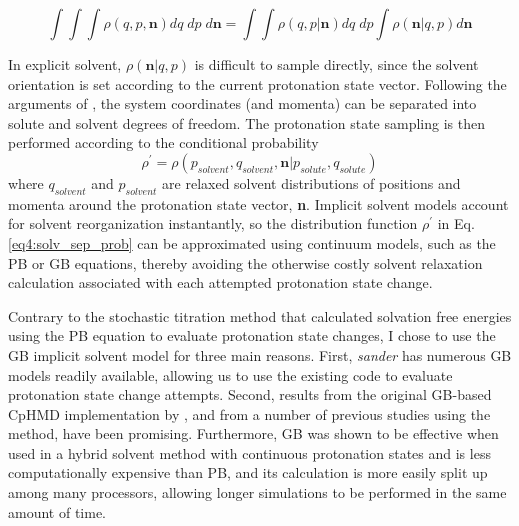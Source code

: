 \begin{equation}
   \int\int\int \rho(q, p, \textbf{n}) dq\;dp\;d\textbf{n} = 
      \int\int\rho(q, p | \textbf{n}) dq\;dp \int \rho(\textbf{n} | q, p)
      d\textbf{n}
   \label{eq4:conditional_probability}
\end{equation}

In explicit solvent, $\rho(\textbf{n} | q, p)$ is difficult to sample directly,
since the solvent orientation is set according to the current protonation state
vector. Following the arguments of
\citeauthor{Baptista_JChemPhys_2002_v117_p4184}, the system coordinates (and
momenta) can be separated into solute and solvent degrees of freedom. 
\cite{Baptista_JChemPhys_2002_v117_p4184} The protonation state sampling is then
performed according to the conditional probability
\begin{equation}
   \rho^\prime = \rho(p_{solvent}, q_{solvent}, \textbf{n} | p_{solute},
         q_{solute})
   \label{eq4:solv_sep_prob}
\end{equation}
where $q_{solvent}$ and $p_{solvent}$ are relaxed solvent
distributions of positions and momenta around the protonation state vector,
\textbf{n}. \cite{Baptista_JChemPhys_2002_v117_p4184} Implicit solvent models
account for solvent reorganization instantantly, so the distribution function
$\rho^\prime$ in Eq.  \ref{eq4:solv_sep_prob} can be approximated using
continuum models, such as the PB or GB equations, thereby avoiding the otherwise
costly solvent relaxation calculation associated with each attempted protonation
state change.

Contrary to the stochastic titration method that calculated solvation free
energies using the PB equation to evaluate protonation state changes,
\cite{Baptista_JChemPhys_2002_v117_p4184} I chose to use the GB implicit
solvent model for three main reasons. First, \emph{sander} has numerous GB
models readily available, \cite{Hawkins_ChemPhysLett_1995_v246_p122,
Hawkins_JPhysChem_1996_v100_p19824, Onufriev_Proteins_2004_v55_p383,
Mongan_JChemTheoryComput_2007_v3_p156, Shang_JMolGraphics_2011_v29_p676}
allowing us to use the existing code to evaluate protonation state change
attempts.  Second, results from the original GB-based CpHMD implementation by
\citeauthor{Mongan_JComputChem_2004_v25_p2038}, and from a number of
previous studies using the method, have been promising.
\cite{Mongan_JComputChem_2004_v25_p2038, Frantz_JCellBiol_2008_v183_p865,
Williams_JChemTheoryComput_2010_v6_p560, Swails_JChemTheoryComput_2012_v8_p4393}
Furthermore, GB was shown to be effective when used in a hybrid solvent method
with continuous protonation states
\cite{Wallace_JChemTheoryComput_2011_v7_p2617} and is less computationally
expensive than PB, and its calculation is more easily split up among many
processors, allowing longer simulations to be performed in the same amount of
time.

